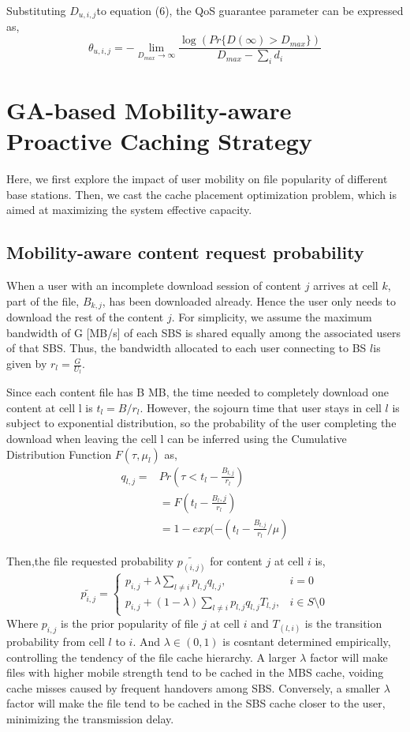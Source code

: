 \documentclass[conference]{IEEEtran}
\begin{document}
Substituting $D_{u,i,j}$to equation (6), the QoS guarantee parameter can be expressed as,
\begin{equation}
\theta_{u,i,j}=-\lim_{D_{max}\to \infty}\frac{\log(Pr\{D(\infty)>D_{max}\})}{D_{max}-\sum_i d_i}
\end{equation}

\section{GA-based Mobility-aware Proactive Caching Strategy}
Here, we first explore the impact of user mobility on file popularity of different base stations. Then, we cast the cache placement optimization problem, which is aimed at maximizing the system effective capacity.
\subsection{Mobility-aware content request probability}
When a user with an incomplete download session of content $j$ arrives at cell $k$, part of the file, $B_{k,j}$, has been downloaded already. Hence the user only needs to download the rest of the content $j$. For simplicity, we assume the maximum bandwidth of G [MB/s] of each SBS is shared equally among the associated users of that SBS. Thus, the bandwidth allocated to each user connecting to BS $l$is given by $r_l=\frac{G}{U_l}$.

Since each content file has B MB, the time needed to completely download one content at cell l is $t_l=B/r_l$.
However, the sojourn time that user stays in cell $l$ is subject to exponential distribution, so the probability of the user completing the download when leaving the cell l can be inferred using the Cumulative Distribution Function $F(\tau,\mu_l)$ as,
\begin{equation}
  \begin{aligned}
 q_{l,j}=& Pr(\tau<t_l-\frac{B_{l,j}}{r_l})\\
  &=F(t_l-\frac{B_l,j}{r_l})\\
  &=1-exp(-(t_l-\frac{B_{l,j}}{r_l}/\mu)
  \end{aligned}
\end{equation}

Then,the file requested probability $\tilde{p_(i,j)}$ for content $j$ at cell $i$ is,
\begin{equation}
\tilde{p_{i,j}}=
\begin{cases}
p_{i,j}+\lambda\sum_{l\neq i}p_{l,j}q_{l,j},  & i=0\\
p_{i,j}+(1-\lambda)\sum_{l\neq i}p_{l,j}q_{l,j}T_{l,j}, & i\in S\setminus 0
\end{cases}
\end{equation}
Where $p_{i,j}$ is the prior popularity of file $j$ at cell $i$ and $T_(l,i)$ is the transition probability from cell $l$ to $i$. And $\lambda\in(0,1)$ is cosntant determined empirically, controlling the tendency of the file cache hierarchy. A larger $\lambda$ factor will make files with higher mobile strength tend to be cached in the MBS cache, voiding cache misses caused by frequent handovers among SBS. Conversely, a smaller $\lambda$ factor will make the file tend to be cached in the SBS cache closer to the user, minimizing the transmission delay.
\end{document}
